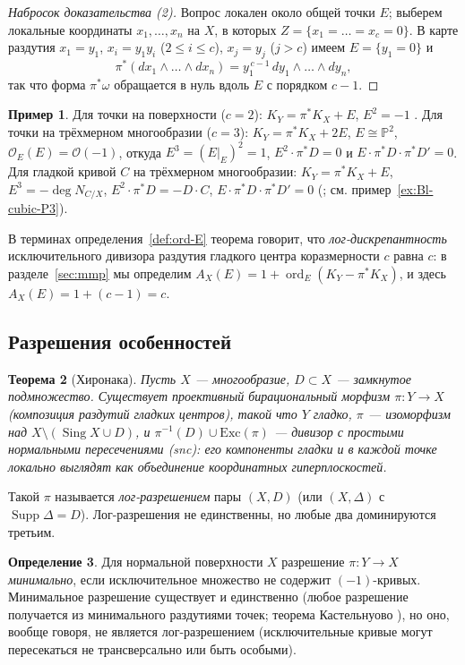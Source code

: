 \documentclass[11pt,a4paper]{article}
\theoremstyle{plain}
\newtheorem{theorem}{Теорема}[section]
\theoremstyle{definition}
\newtheorem{definition}[theorem]{Определение}
\newtheorem{example}[theorem]{Пример}
\theoremstyle{remark}
\newcommand{\PP}{\mathbb{P}}
\newcommand{\cO}{\mathcal{O}}
\DeclareMathOperator{\ord}{ord}
\DeclareMathOperator{\Sing}{Sing}
\DeclareMathOperator{\Supp}{Supp}
\begin{document}
\begin{proof}[Набросок доказательства (2)]
Вопрос локален около общей точки $E$; выберем локальные координаты $x_1,\dots,x_n$ на $X$, в
которых $Z=\{x_1=\dots=x_c=0\}$. В карте раздутия $x_1=y_1$, $x_i=y_1y_i$ ($2\le i\le c$),
$x_j=y_j$ ($j>c$) имеем $E=\{y_1=0\}$ и
\[
\pi^*(dx_1\wedge\dots\wedge dx_n)=y_1^{\,c-1}\,dy_1\wedge\dots\wedge dy_n ,
\]
так что форма $\pi^*\omega$ обращается в нуль вдоль $E$ с порядком $c-1$.
\end{proof}

\begin{example}
Для точки на поверхности ($c=2$): $K_Y=\pi^*K_X+E$, $E^2=-1$ \cite[7.6]{AG}. Для точки на
трёхмерном многообразии ($c=3$): $K_Y=\pi^*K_X+2E$, $E\cong\PP^2$, $\cO_E(E)=\cO(-1)$, откуда
$E^3=(E|_E)^2=1$, $E^2\cdot\pi^*D=0$ и $E\cdot\pi^*D\cdot\pi^*D'=0$. Для гладкой кривой $C$ на
трёхмерном многообразии: $K_Y=\pi^*K_X+E$, $E^3=-\deg N_{C/X}$, $E^2\cdot\pi^*D=-D\cdot C$,
$E\cdot\pi^*D\cdot\pi^*D'=0$ (\cite[IV.6]{Fulton}; см. пример~\ref{ex:Bl-cubic-P3}).
\end{example}

В терминах определения~\ref{def:ord-E} теорема говорит, что \emph{лог-дискрепантность}
исключительного дивизора раздутия гладкого центра коразмерности $c$ равна $c$: в разделе~\ref{sec:mmp}
мы определим $A_X(E)=1+\ord_E(K_Y-\pi^*K_X)$, и здесь $A_X(E)=1+(c-1)=c$.

\subsection{Разрешения особенностей}

\begin{theorem}[Хиронака]\label{thm:Hironaka}
Пусть $X$ --- многообразие, $D\subset X$ --- замкнутое подмножество. Существует проективный
бирациональный морфизм $\pi\colon Y\to X$ (композиция раздутий гладких центров), такой что $Y$
гладко, $\pi$ --- изоморфизм над $X\setminus(\Sing X\cup D)$, и $\pi^{-1}(D)\cup\mathrm{Exc}(\pi)$
--- дивизор с \emph{простыми нормальными пересечениями} (snc): его компоненты гладки и в каждой
точке локально выглядят как объединение координатных гиперплоскостей.
\end{theorem}

Такой $\pi$ называется \emph{лог-разрешением} пары $(X,D)$ (или $(X,\Delta)$ с $\Supp\Delta=D$).
Лог-разрешения не единственны, но любые два доминируются третьим.

\begin{definition}
Для нормальной поверхности $X$ разрешение $\pi\colon Y\to X$ \emph{минимально}, если
исключительное множество не содержит $(-1)$-кривых. Минимальное разрешение существует и единственно
(любое разрешение получается из минимального раздутиями точек; теорема Кастельнуово
\cite[7.8]{AG}), но оно, вообще говоря, не является лог-разрешением (исключительные кривые могут
пересекаться не трансверсально или быть особыми).
\end{definition}
\end{document}
